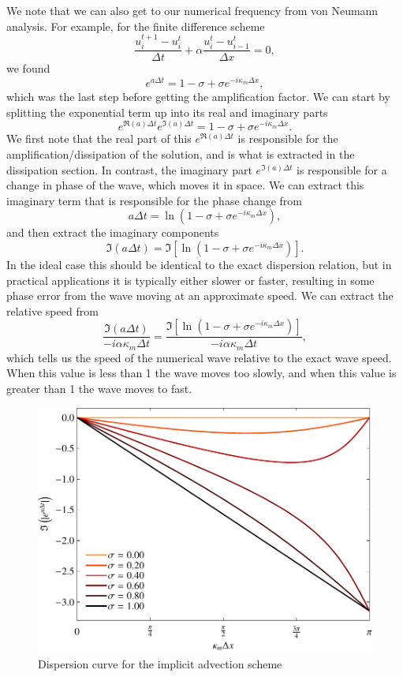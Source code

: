 We note that we can also get to our numerical frequency from von Neumann analysis. For example, for the finite difference scheme
\begin{equation}
	\frac{u_i^{t+1} - u_{i}^t}{\Delta t} +  \alpha \frac{u_i^t - u_{i-1}^t}{\Delta x} = 0,
\end{equation}
we found
\begin{equation}
	e^{a\Delta t} = 1 - \sigma + \sigma e^{-i \kappa_m \Delta x},
\end{equation} 
which was the last step before getting the amplification factor. We can start by splitting the exponential term up into its real and imaginary parts
\begin{equation}
	e^{\Re{(a)}\Delta t} e^{\Im{(a)}\Delta t} = 1 - \sigma + \sigma e^{-i \kappa_m \Delta x}.
\end{equation} 
We first note that the real part of this $e^{\Re{(a)}\Delta t}$ is responsible for the amplification/dissipation of the solution, and is what is extracted in the dissipation section. In contrast, the imaginary part $e^{\Im{(a)}\Delta t}$ is responsible for a change in phase of the wave, which moves it in space. We can extract this imaginary term that is responsible for the phase change from
\begin{equation}
	a\Delta t = \ln \left(1 - \sigma + \sigma e^{-i \kappa_m \Delta x} \right),
\end{equation} 
and then extract the imaginary components
\begin{equation}
	\Im(a\Delta t) = \Im{ \left[ \ln \left(1 - \sigma + \sigma e^{-i \kappa_m \Delta x} \right) \right]}.
\end{equation}
In the ideal case this should be identical to the exact dispersion relation, but in practical applications it is typically either slower or faster, resulting in some phase error from the wave moving at an approximate speed. We can extract the relative speed from
\begin{equation}
	\frac{\Im(a\Delta t)}{-i \alpha \kappa_m \Delta t} = \frac{\Im{ \left[ \ln \left(1 - \sigma + \sigma e^{-i \kappa_m \Delta x} \right) \right]}}{-i \alpha \kappa_m \Delta t},
\end{equation}
which tells us the speed of the numerical wave relative to the exact wave speed. When this value is less than 1 the wave moves too slowly, and when this value is greater than 1 the wave moves to fast.
\begin{figure}[htbp]
	\centering
	\includegraphics[width=0.6\linewidth]{Pictures/dispersion_adv_explct}
	\caption{Dispersion curve for the implicit advection scheme}
	\label{fig:dissipation_advection_implicit}
\end{figure}
